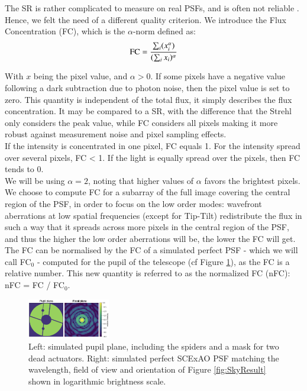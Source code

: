 \documentclass[twocolumn]{aa}
\begin{document}
The SR is rather complicated to measure on real PSFs, and is often not reliable \citep{Roberts2004Strehl}. Hence, we felt the need of a different quality criterion. 
We introduce the Flux Concentration (FC), which is the $\alpha$-norm defined as: 
\begin{equation}
\centering
    \text{FC} = \frac{\sum_i  (x_i^{\alpha})}{ (\sum_i x_i ) ^{\alpha}}
\end{equation}



With $x$ being the pixel value, and $\alpha > 0$. If some pixels have a negative value following a dark subtraction due to photon noise, then the pixel value is set to zero. 
This quantity is independent of the total flux, it simply describes the flux concentration. It may be compared to a SR, with the difference that the Strehl only considers the peak value, while FC considers all pixels making it more robust against measurement noise and pixel sampling effects.  \\
If the intensity is concentrated in one pixel, FC equals 1. For the intensity spread over several pixels, FC < 1. If the light is equally spread over the pixels, then FC tends to 0. 
\\

We will be using $\alpha = 2$, noting that higher values of $\alpha$ favors the brightest pixels. \\

We choose to compute FC for a subarray of the full image covering the central region of the PSF, in order to focus on the low order modes: wavefront aberrations at low spatial frequencies (except for Tip-Tilt) redistribute the flux in such a way that it spreads across more pixels in the central region of the PSF, and thus the higher the low order aberrations will be, the lower the FC will get. 
The FC can be normalised by the FC of a simulated perfect PSF - which we will call 
FC$_0$ - 
computed for the pupil of the telescope (cf Figure \ref{fig:perfect_psf}), as the FC is a relative number. 
This new quantity is referred to as the normalized FC (nFC): nFC = FC / FC$_0$.


\begin{figure}[t]
\centering
\includegraphics[width=0.32\textwidth]{fig/perfect_psf.png}
\caption{Left: simulated pupil plane, including the spiders and a mask for two dead actuators. Right: simulated perfect SCExAO PSF matching the wavelength, field of view and orientation of Figure \ref{fig:SkyResult} shown in logarithmic brightness scale. }
\label{fig:perfect_psf}
\end{figure}
\end{document}

